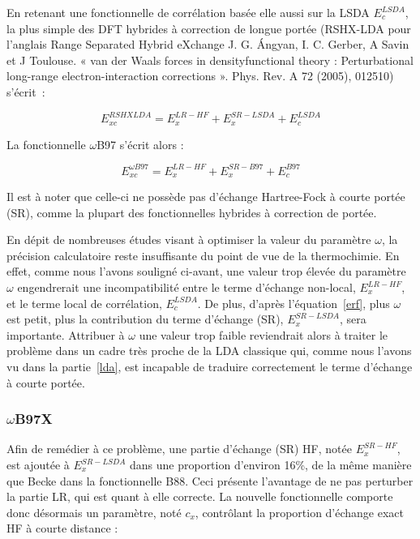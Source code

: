 	En retenant une fonctionnelle de corrélation basée elle aussi sur la LSDA $E_{c}^{LSDA}$, la plus simple des DFT hybrides à correction de longue portée (RSHX-LDA pour l’anglais \og Range Separated Hybrid eXchange \fg{} J. G. Ángyan, I. C. Gerber, A Savin et J Toulouse. « van der Waals forces in densityfunctional theory : Perturbational long-range electron-interaction corrections ». Phys. Rev. A 72 (2005), 012510) s'écrit~:
	
	\begin{equation}
	E_{xc}^{RSHXLDA} = E_{x}^{LR-HF} + E_{x}^{SR-LSDA} + E_{c}^{LSDA}
	\end{equation}
	
	La fonctionnelle $\omega$B97\cite{chai2008long} s'écrit alors :
	
	\begin{equation}
	E_{xc}^{\omega B97} = E_{x}^{LR-HF} + E_{x}^{SR-B97} + E_{c}^{B97}
	\end{equation}
	
	Il est à noter que celle-ci ne possède pas d'échange Hartree-Fock à courte portée (SR), comme la plupart des fonctionnelles hybrides à correction de portée.
	
	En dépit de nombreuses études visant à optimiser la valeur du paramètre $\omega$, la précision calculatoire reste insuffisante du point de vue de la thermochimie. En effet, comme nous l'avons souligné ci-avant, une valeur trop élevée du paramètre $\omega$ engendrerait une incompatibilité entre le terme d'échange non-local, $E_{x}^{LR-HF}$, et le terme local de corrélation, $E_{c}^{LSDA}$. De plus, d'après l'équation~\ref{erf}, plus $\omega$ est petit, plus la contribution du terme d'échange (SR), $E_{x}^{SR-LSDA}$, sera importante. Attribuer à $\omega$ une valeur trop faible reviendrait alors à traiter le problème dans un cadre très proche de la LDA classique qui, comme nous l'avons vu dans la partie~\ref{lda}, est incapable de traduire correctement le terme d'échange à courte portée.
	
	\subsubsection{$\omega$B97X}
	
	Afin de remédier à ce problème, une partie d'échange (SR) HF, notée $E_{x}^{SR-HF}$, est ajoutée à $E_{x}^{SR-LSDA}$ dans une proportion d'environ 16\%, de la même manière que Becke dans la fonctionnelle B88. Ceci présente l'avantage de ne pas perturber la partie LR, qui est quant à elle correcte. La nouvelle fonctionnelle comporte donc désormais un paramètre, noté $c_{x}$, contrôlant la proportion d'échange exact HF à courte distance :
	
